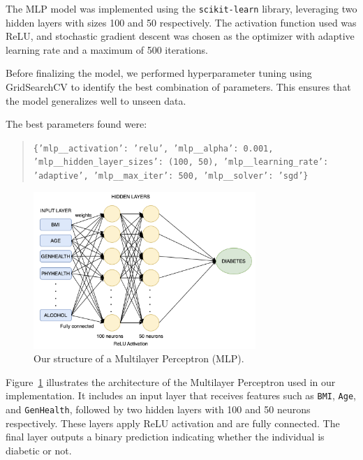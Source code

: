 The MLP model was implemented using the \texttt{scikit-learn} library, leveraging two hidden layers with sizes 100 and 50 respectively. The activation function used was ReLU, and stochastic gradient descent was chosen as the optimizer with adaptive learning rate and a maximum of 500 iterations.

Before finalizing the model, we performed hyperparameter tuning using GridSearchCV to identify the best combination of parameters. This ensures that the model generalizes well to unseen data.

\noindent
The best parameters found were:
\begin{quote}
\texttt{\{'mlp\_\_activation': 'relu', 'mlp\_\_alpha': 0.001, 'mlp\_\_hidden\_layer\_sizes': (100, 50), 'mlp\_\_learning\_rate': 'adaptive', 'mlp\_\_max\_iter': 500, 'mlp\_\_solver': 'sgd'\}}
\end{quote}



\begin{figure}[H]
    \centering
    \includegraphics[width=0.75\textwidth]{images/our-mlp-diagram.png} %
    \caption{Our structure of a Multilayer Perceptron (MLP).}
    \label{fig:mlp-arch}
\end{figure}

\vspace{0.5em}

\noindent
Figure~\ref{fig:mlp-arch} illustrates the architecture of the Multilayer Perceptron used in our implementation. It includes an input layer that receives features such as \texttt{BMI}, \texttt{Age}, and \texttt{GenHealth}, followed by two hidden layers with 100 and 50 neurons respectively. These layers apply ReLU activation and are fully connected. The final layer outputs a binary prediction indicating whether the individual is diabetic or not.


